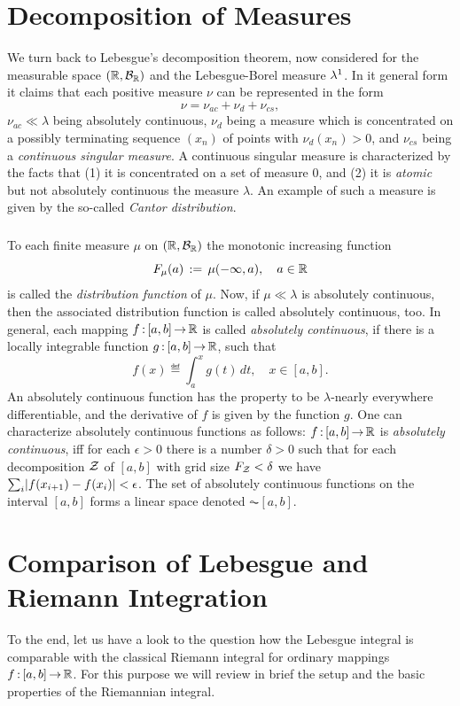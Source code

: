 \documentclass[11pt,twoside]{article}
\begin{document}
\section{Decomposition of Measures}
We turn back to Lebesgue's decomposition theorem, 
now considered for the measurable space $(\R,\Borel{\R})$
and the Lebesgue-Borel measure $\LB^1$.
In it general form it claims
that each positive measure $\nu$ can be represented in the form
\[
\nu = \nu_{ac} + \nu_d + \nu_{cs},
\]
$\nu_{ac} \ll \lambda$ being absolutely continuous,
$\nu_d$ being a measure 
which is concentrated on a possibly terminating sequence $(x_n)$
of points with $\nu_d(x_n) >0$,
and $\nu_{cs}$ being a \textit{continuous singular measure}.
A continuous singular measure is characterized by the facts
that
(1) it is concentrated on a set of measure $0$, and
(2) it is \textit{atomic}
    but not absolutely continuous {\wrt} the measure  $\lambda$.
An example of such a measure is given by the so-called
\textit{Cantor distribution}.

\subparagraph{}
To each finite measure $\mu$ on $(\R,\Borel{\R})$ 
the monotonic increasing function
\[
F_{\mu}(a) \eqdef \mu(-\infty,a), \quad a \in \R
\]
is called the \textit{distribution function} of $\mu$.
Now, if $\mu \ll \lambda$ is absolutely continuous,
then the associated distribution function is called absolutely continuous, too.
In general,
each mapping $f \: [a,b] \xto \R$ is called \textit{absolutely continuous},
if there is a locally integrable function $g \: [a,b] \xto \R$,
such that
\[
f(x) \eqdef \int_a^x g(t) \, dt, \quad x \in [a,b].
\]
An absolutely continuous function has the property to be
$\lambda$-nearly everywhere differentiable,
and the derivative of $f$ is given by the function $g$.
One can characterize absolutely continuous functions as follows:
$f \: [a,b] \xto \R$ is \textit{absolutely continuous},
iff for each $\epsilon > 0$ there is a number $\delta > 0$
such that for each decomposition $\cal{Z}$ of $[a,b]$ with
grid size $F_{\cal{Z}} < \delta$
we have
$\sum_i \abs{ f(x_{i+1}) - f(x_i) } < \epsilon$.
The set of absolutely continuous functions on the interval $[a,b]$
forms a linear space denoted $\AC{[a,b]}$.

\section{Comparison of Lebesgue and Riemann Integration}
To the end,
let us have a look to the question
how the Lebesgue integral is comparable with the classical Riemann integral
for ordinary mappings $f \: [a,b] \xto \R$.
For this purpose we will review in brief the setup and the basic properties
of the Riemannian integral.
\end{document}
